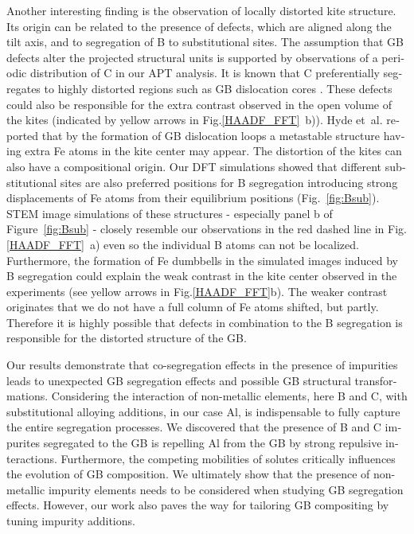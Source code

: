 \documentclass[12pt,a4paper,twoside,twocolumn,english,english]{article}
\begin{document}
\begin{otherlanguage}{english}
Another interesting finding is the observation of locally distorted kite structure. Its origin can be related to the presence of defects, which are aligned along the tilt axis, and to segregation of B to substitutional sites. The assumption that GB defects alter the projected structural units is supported by observations of a periodic distribution of C in our APT analysis. It is known that C preferentially segregates to highly distorted regions such as GB dislocation cores \cite{hristova_solubility_2011}. These defects could also be responsible for the extra contrast observed in the open volume of the kites (indicated by yellow arrows in Fig.\ref{HAADF_FFT}~b)). Hyde et~al. \cite{hyde_atomistic_2005} reported that by the formation of GB dislocation loops a metastable structure having extra Fe atoms in the kite center may appear. 
The distortion of the kites can also have a compositional origin. Our DFT simulations showed that different substitutional sites are also preferred positions for B segregation introducing strong displacements of Fe atoms from their equilibrium positions (Fig.~\ref{fig:Bsub}). STEM image simulations of these structures - especially panel b of Figure~\ref{fig:Bsub} - closely resemble our observations in the red dashed line in Fig.\ref{HAADF_FFT}~a) even so the individual B atoms can not be localized. Furthermore, the formation of Fe dumbbells in the simulated images induced by B segregation could explain the weak contrast in the kite center observed in the experiments (see yellow arrows in Fig.\ref{HAADF_FFT}b). The weaker contrast originates that we do not have a full column of Fe atoms shifted, but partly. Therefore it is highly possible that defects in combination to the B segregation is responsible for the distorted structure of the GB. 

Our results demonstrate that co-segregation effects in the presence of impurities leads to unexpected GB segregation effects and possible GB structural transformations. Considering the interaction of non-metallic elements, here B and C, with substitutional alloying additions, in our case Al, is indispensable to fully capture the entire segregation processes. We discovered that the presence of B and C impurites segregated to the GB is repelling Al from the GB by strong repulsive interactions. Furthermore, the competing mobilities of solutes critically influences the evolution of GB composition. We ultimately show that the presence of non-metallic impurity elements needs to be considered when studying GB segregation effects. However, our work also paves the way for tailoring GB compositing by tuning impurity additions.


\end{otherlanguage}
\end{document}
